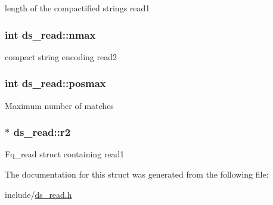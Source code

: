 length of the compactified strings read1 \hypertarget{structds__read_ae4cb668ce0d39411b13ed2720743dbf7}{
\subsubsection[{nmax}]{\setlength{\rightskip}{0pt plus 5cm}int ds\+\_\+read\+::nmax}}\label{structds__read_ae4cb668ce0d39411b13ed2720743dbf7}
compact string encoding read2 \hypertarget{structds__read_a62deaafbd72150dfc13c8f7dfa658914}{
\subsubsection[{posmax}]{\setlength{\rightskip}{0pt plus 5cm}int ds\+\_\+read\+::posmax}}\label{structds__read_a62deaafbd72150dfc13c8f7dfa658914}
Maximum number of matches \hypertarget{structds__read_a9c3b84ac6a0349a9beff6c11f6ee5275}{
\subsubsection[{r2}]{$\ast$ ds\+\_\+read\+::r2}}\label{structds__read_a9c3b84ac6a0349a9beff6c11f6ee5275}
Fq\+\_\+read struct containing read1 

The documentation for this struct was generated from the following file\+:\begin{DoxyCompactItemize}
\item 
include/\hyperlink{ds__read_8h}{ds\+\_\+read.\+h}\end{DoxyCompactItemize}
